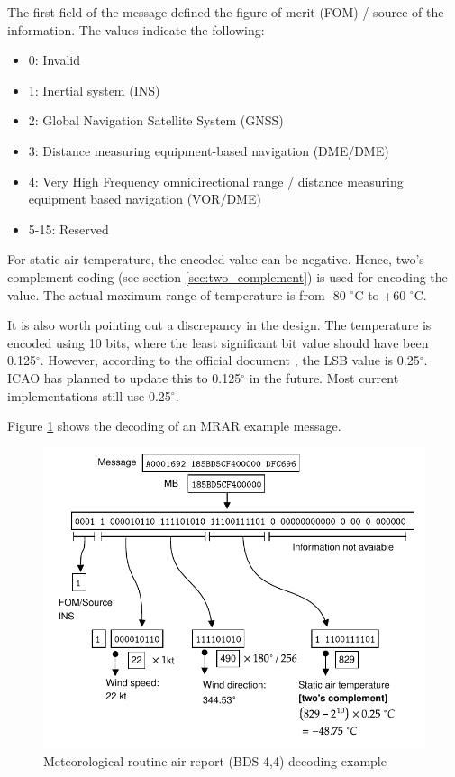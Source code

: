 The first field of the message defined the figure of merit (FOM) / source of the information. The values indicate the following:
\begin{itemize}
    \item 0: Invalid
    \item 1: Inertial system (INS)
    \item 2: Global Navigation Satellite System (GNSS)
    \item 3: Distance measuring equipment-based navigation (DME/DME)
    \item 4: Very High Frequency omnidirectional range / distance measuring equipment based navigation (VOR/DME)
    \item 5-15: Reserved
\end{itemize}

For static air temperature, the encoded value can be negative. Hence, two's complement coding (see section \ref{sec:two_complement}) is used for encoding the value. The actual maximum range of temperature is from -80 $^\circ$C to +60 $^\circ$C.

It is also worth pointing out a discrepancy in the design. The temperature is encoded using 10 bits, where the least significant bit value should have been 0.125$^\circ$. However, according to the official document \cite{icao9871v1}, the LSB value is 0.25$^\circ$. ICAO has planned to update this to 0.125$^\circ$ in the future. Most current implementations still use 0.25$^\circ$. 

Figure \ref{fig:bds44_example} shows the decoding of an MRAR example message.

\begin{figure}[ht]
    \centering
    \includegraphics[scale=0.9]{figures/mode_s/bds44_example.pdf}
    \caption{Meteorological routine air report (BDS 4,4) decoding example}
    \label{fig:bds44_example}
  \end{figure}
  
